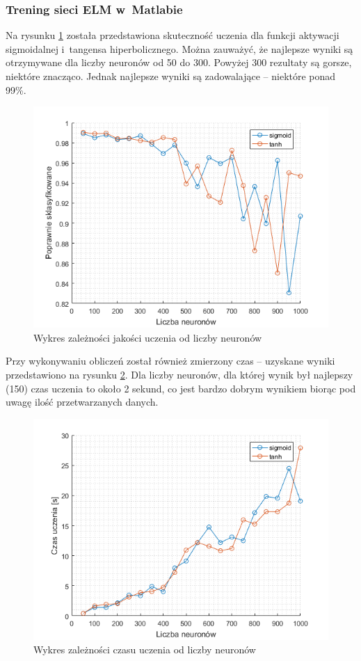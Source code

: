 \documentclass{article}
\begin{document}
\subsubsection{Trening sieci ELM w~Matlabie}
Na rysunku \ref{dota_liczba_neuronow} została przedstawiona skuteczność uczenia dla funkcji aktywacji sigmoidalnej i~tangensa hiperbolicznego.
Można zauważyć, że najlepsze wyniki są otrzymywane dla liczby neuronów od 50 do 300.
Powyżej 300 rezultaty są gorsze, niektóre znacząco.
Jednak najlepsze wyniki są zadowalające -- niektóre ponad 99\%.
\begin{figure}[H]
\centering
\includegraphics[width=\textwidth]{dota_liczba_neuronow.png}
\caption{Wykres zależności jakości uczenia od liczby neuronów}
\label{dota_liczba_neuronow}
\end{figure}

Przy wykonywaniu obliczeń został również zmierzony czas -- uzyskane wyniki przedstawiono na rysunku \ref{dota_wydajnosc}.
Dla liczby neuronów, dla której wynik był najlepszy (150) czas uczenia to około 2 sekund, co jest bardzo dobrym wynikiem biorąc pod uwagę ilość przetwarzanych danych.
\begin{figure}[H]
\centering
\includegraphics[width=\textwidth]{dota_wydajnosc.png}
\caption{Wykres zależności czasu uczenia od liczby neuronów}
\label{dota_wydajnosc}
\end{figure}
\end{document}
